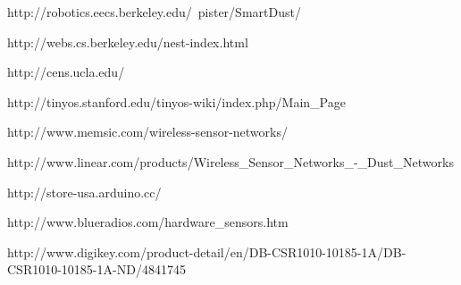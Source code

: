 \documentclass[ppfs.tex]{template/subfiles}
\begin{document}
\begin{thebibliography}{9}

http://robotics.eecs.berkeley.edu/~pister/SmartDust/

http://webs.cs.berkeley.edu/nest-index.html

http://cens.ucla.edu/

http://tinyos.stanford.edu/tinyos-wiki/index.php/Main\_Page

http://www.memsic.com/wireless-sensor-networks/

http://www.linear.com/products/Wireless\_Sensor\_Networks\_-\_Dust\_Networks

http://store-usa.arduino.cc/

http://www.blueradios.com/hardware\_sensors.htm

http://www.digikey.com/product-detail/en/DB-CSR1010-10185-1A/DB-CSR1010-10185-1A-ND/4841745

\end{thebibliography}
\end{document}
